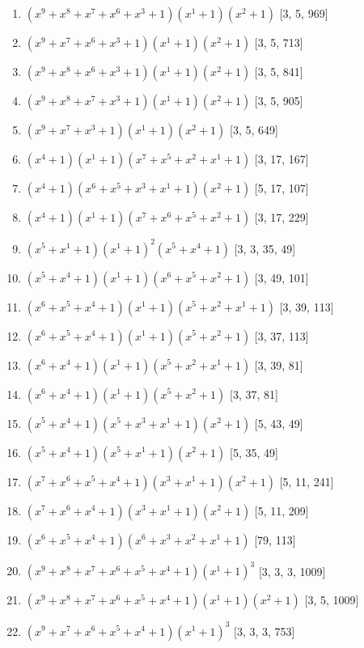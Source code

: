 \documentclass[10pt,twocolumn]{article}
\begin{document}
\begin{enumerate}
\item $(x^{9} + x^{8} + x^{7} + x^{6} + x^{3} + 1)(x^{1} + 1)(x^{2} + 1)$  [3, 5, 969]
\item $(x^{9} + x^{7} + x^{6} + x^{3} + 1)(x^{1} + 1)(x^{2} + 1)$  [3, 5, 713]
\item $(x^{9} + x^{8} + x^{6} + x^{3} + 1)(x^{1} + 1)(x^{2} + 1)$  [3, 5, 841]
\item $(x^{9} + x^{8} + x^{7} + x^{3} + 1)(x^{1} + 1)(x^{2} + 1)$  [3, 5, 905]
\item $(x^{9} + x^{7} + x^{3} + 1)(x^{1} + 1)(x^{2} + 1)$  [3, 5, 649]
\item $(x^{4} + 1)(x^{1} + 1)(x^{7} + x^{5} + x^{2} + x^{1} + 1)$  [3, 17, 167]
\item $(x^{4} + 1)(x^{6} + x^{5} + x^{3} + x^{1} + 1)(x^{2} + 1)$  [5, 17, 107]
\item $(x^{4} + 1)(x^{1} + 1)(x^{7} + x^{6} + x^{5} + x^{2} + 1)$  [3, 17, 229]
\item $(x^{5} + x^{1} + 1)(x^{1} + 1)^{2}(x^{5} + x^{4} + 1)$  [3, 3, 35, 49]
\item $(x^{5} + x^{4} + 1)(x^{1} + 1)(x^{6} + x^{5} + x^{2} + 1)$  [3, 49, 101]
\item $(x^{6} + x^{5} + x^{4} + 1)(x^{1} + 1)(x^{5} + x^{2} + x^{1} + 1)$  [3, 39, 113]
\item $(x^{6} + x^{5} + x^{4} + 1)(x^{1} + 1)(x^{5} + x^{2} + 1)$  [3, 37, 113]
\item $(x^{6} + x^{4} + 1)(x^{1} + 1)(x^{5} + x^{2} + x^{1} + 1)$  [3, 39, 81]
\item $(x^{6} + x^{4} + 1)(x^{1} + 1)(x^{5} + x^{2} + 1)$  [3, 37, 81]
\item $(x^{5} + x^{4} + 1)(x^{5} + x^{3} + x^{1} + 1)(x^{2} + 1)$  [5, 43, 49]
\item $(x^{5} + x^{4} + 1)(x^{5} + x^{1} + 1)(x^{2} + 1)$  [5, 35, 49]
\item $(x^{7} + x^{6} + x^{5} + x^{4} + 1)(x^{3} + x^{1} + 1)(x^{2} + 1)$  [5, 11, 241]
\item $(x^{7} + x^{6} + x^{4} + 1)(x^{3} + x^{1} + 1)(x^{2} + 1)$  [5, 11, 209]
\item $(x^{6} + x^{5} + x^{4} + 1)(x^{6} + x^{3} + x^{2} + x^{1} + 1)$  [79, 113]
\item $(x^{9} + x^{8} + x^{7} + x^{6} + x^{5} + x^{4} + 1)(x^{1} + 1)^{3}$  [3, 3, 3, 1009]
\item $(x^{9} + x^{8} + x^{7} + x^{6} + x^{5} + x^{4} + 1)(x^{1} + 1)(x^{2} + 1)$  [3, 5, 1009]
\item $(x^{9} + x^{7} + x^{6} + x^{5} + x^{4} + 1)(x^{1} + 1)^{3}$  [3, 3, 3, 753]

\end{enumerate}
\end{document}
